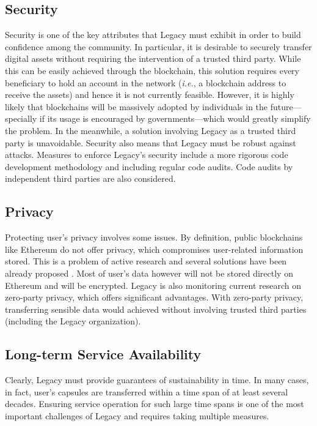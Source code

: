 \subsection{Security} %
\label{sub:security}
Security is one of the key attributes that Legacy must exhibit in order to build confidence among the community. 
In particular, it is desirable to securely transfer digital assets without requiring the intervention of a trusted third party. 
While this can be easily achieved through the blockchain, this solution requires every beneficiary to hold an account in the network (\textit{i.e.}, a blockchain address to receive the assets) and hence it is not currently feasible.
However, it is highly likely that blockchains will be massively adopted by individuals in the future---specially if its usage is encouraged by governments---which would greatly simplify the problem.
In the meanwhile, a solution involving Legacy as a trusted third party is unavoidable.
Security also means that Legacy must be robust against attacks. Measures to enforce Legacy's security include a more rigorous code development methodology and including regular code audits. Code audits by independent third parties are also considered.



\subsection{Privacy} %
\label{sub:privacy}
Protecting user's privacy involves some issues. By definition, public blockchains like Ethereum do not offer privacy, which compromises user-related information stored. This is a problem of active research and several solutions have been already proposed \cite{Buterin}. Most of user's data however will not be stored directly on Ethereum and will be encrypted.
Legacy is also monitoring current research on zero-party privacy, which offers significant advantages. With zero-party privacy, transferring sensible data would achieved without involving trusted third parties (including the Legacy organization).

\subsection{Long-term Service Availability} %
\label{sub:long_term_service_availability}
Clearly, Legacy must provide guarantees of sustainability in time. In many cases, in fact, user's capsules are transferred within a time span of at least several decades.  Ensuring service operation for such large time spans is one of the most important challenges of Legacy and requires taking multiple measures. 

